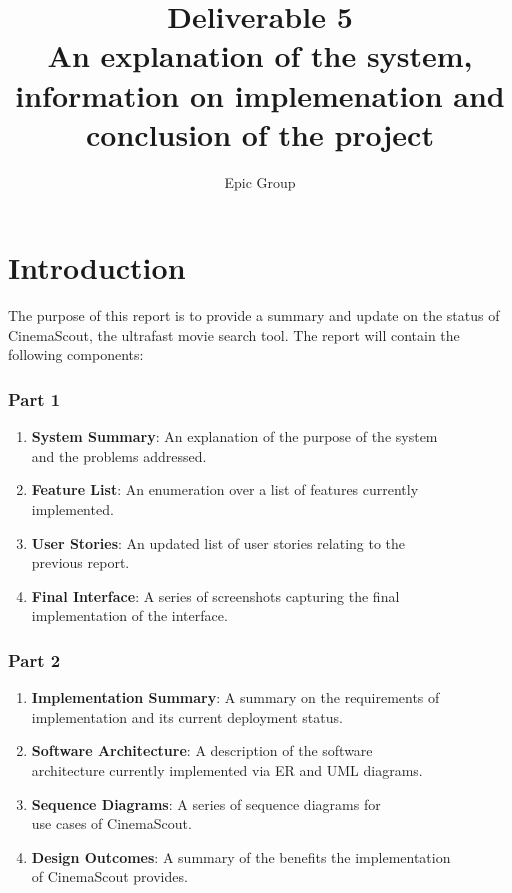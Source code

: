 \documentclass{article}
\begin{document}
\title{%
 Deliverable 5\\
 \large An explanation of the system, information on implemenation and\\
 \large conclusion of the project
}
\author{Epic Group}
\date{}
\maketitle

\section*{Introduction}
The purpose of this report is to provide a summary and update on the status of
CinemaScout, the ultrafast movie search tool. The report will contain the following
components:
\subsubsection*{Part 1}
\begin{enumerate}
\item \textbf{System Summary}: An explanation of the purpose of the system\\
and the problems addressed.
\item \textbf{Feature List}: An enumeration over a list of features currently\\
implemented.
\item \textbf{User Stories}: An updated list of user stories relating to the\\
previous report.
\item \textbf{Final Interface}: A series of screenshots capturing the final\\
implementation of the interface.
\end{enumerate}
\subsubsection*{Part 2}
\begin{enumerate}
\item \textbf{Implementation Summary}: A summary on the requirements of\\
implementation and its current deployment status.
\item \textbf{Software Architecture}: A description of the software\\
architecture currently implemented via ER and UML diagrams.
\item \textbf{Sequence Diagrams}: A series of sequence diagrams for\\
use cases of CinemaScout.
\item \textbf{Design Outcomes}: A summary of the benefits the implementation\\
of CinemaScout provides.
\end{enumerate}
\end{document}
